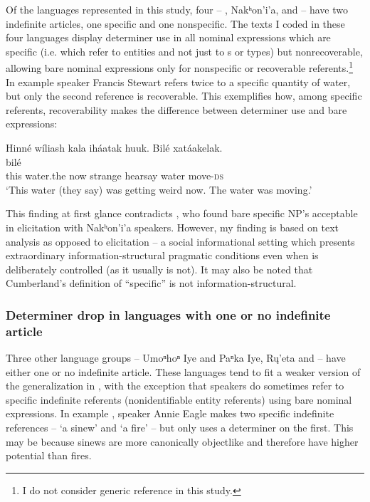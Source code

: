 \documentclass[output=paper]{LSP/langsci}
\begin{document}
Of the languages represented in this study, four -- , Nakʰon’i’a,  and  -- have two indefinite articles, one specific and one nonspecific. The texts I coded in these four languages display determiner use in all nominal expressions which are specific (i.e. which refer to entities and not just to s or types) but nonrecoverable, allowing bare nominal expressions only for nonspecific or recoverable referents.\footnote{I do not consider generic reference in this study.} In example   speaker Francis Stewart refers twice to a specific quantity of water, but only the second reference is recoverable. This exemplifies how, among specific referents, recoverability makes the difference between determiner use and bare expressions:

\ea\label{stewartdrop}
Hinné wíliash kala iháatak huuk. Bilé xatáakelak.\rmfnm\\
\gll	{} 	 		 			 	bilé 		\\
	this 				water.the 					now 			strange 			hearsay 		water		move-\textsc{ds}\\
\glt	`This water (they say) was getting weird now. The water was moving.'
\z

This finding at first glance contradicts \citet{Cumberland2005}, who found bare specific NP’s acceptable in elicitation with Nakʰon’i’a speakers. However, my finding is based on text analysis as opposed to elicitation -- a social informational setting which presents extraordinary information-structural pragmatic conditions even when  is deliberately controlled (as it usually is not). It may also be noted that Cumberland’s definition of “specific” is not information-structural.

\subsubsection{Determiner drop in languages with one or no indefinite article}\label{droponeindef}

Three other language groups -- Umoⁿhoⁿ Iye and Paⁿka Iye, Rų’eta and  -- have either one or no indefinite article. These languages tend to fit a weaker version of the generalization in , with the exception that speakers do sometimes refer to specific indefinite referents (nonidentifiable entity referents) using bare nominal expressions. In example ,  speaker Annie Eagle makes two specific indefinite references -- `a sinew' and `a fire' -- but only uses a determiner on the first. This may be because sinews are more canonically objectlike and therefore have higher  potential than fires.
\end{document}
